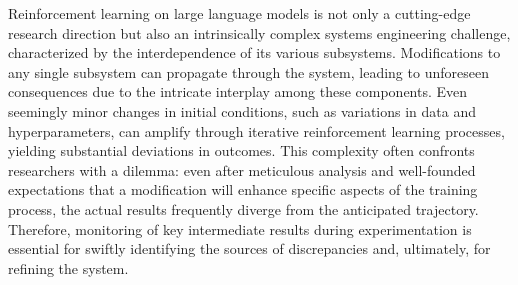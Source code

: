 Reinforcement learning on large language models is not only a cutting-edge research direction but also an intrinsically complex systems engineering challenge, characterized by the interdependence of its various subsystems. Modifications to any single subsystem can propagate through the system, leading to unforeseen consequences due to the intricate interplay among these components. Even seemingly minor changes in initial conditions, such as variations in data and hyperparameters, can amplify through iterative reinforcement learning processes, yielding substantial deviations in outcomes. This complexity often confronts researchers with a dilemma: even after meticulous analysis and well-founded expectations that a modification will enhance specific aspects of the training process, the actual results frequently diverge from the anticipated trajectory. Therefore, monitoring of key intermediate results during experimentation is essential for swiftly identifying the sources of discrepancies and, ultimately, for refining the system. 


